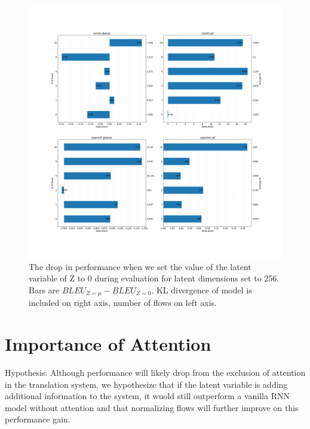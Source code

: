 \begin{figure}
	\includegraphics[width=\linewidth]{diff-z-256-horizontalbarplt.png}
	\caption{The drop in performance when we set the value of the latent variable of Z to 0 during evaluation for latent dimensions set to 256. Bars are $BLEU_{Z=\mu} - BLEU_{Z=0}$. KL divergence of model is included on right axis, number of flows on left axis.}
	\label{fig:barperfdrop}
\end{figure}

\section{Importance of Attention}

Hypothesis:  Although performance will likely drop from the exclusion of attention in the translation system, we hypothesize that if the latent variable is adding additional information to the system, it wuold still outperform a vanilla RNN model without attention and that normalizing flows will further improve on this performance gain.

